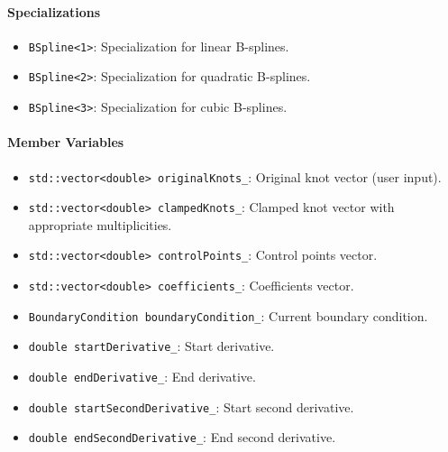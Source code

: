 \documentclass[a4paper]{article}
\begin{document}
\begin{sloppypar}
\paragraph*{Specializations}
\begin{itemize}
  \item \verb|BSpline<1>|: Specialization for linear B-splines.
  \item \verb|BSpline<2>|: Specialization for quadratic B-splines.
  \item \verb|BSpline<3>|: Specialization for cubic B-splines.
\end{itemize}

\paragraph*{Member Variables}
\begin{itemize}
  \item \verb|std::vector<double> originalKnots_|: Original knot vector (user input).
  \item \verb|std::vector<double> clampedKnots_|: Clamped knot vector with appropriate multiplicities.
  \item \verb|std::vector<double> controlPoints_|: Control points vector.
  \item \verb|std::vector<double> coefficients_|: Coefficients vector.
  \item \verb|BoundaryCondition boundaryCondition_|: Current boundary condition.
  \item \verb|double startDerivative_|: Start derivative.
  \item \verb|double endDerivative_|: End derivative.
  \item \verb|double startSecondDerivative_|: Start second derivative.
  \item \verb|double endSecondDerivative_|: End second derivative.
\end{itemize}


\end{sloppypar}
\end{document}
